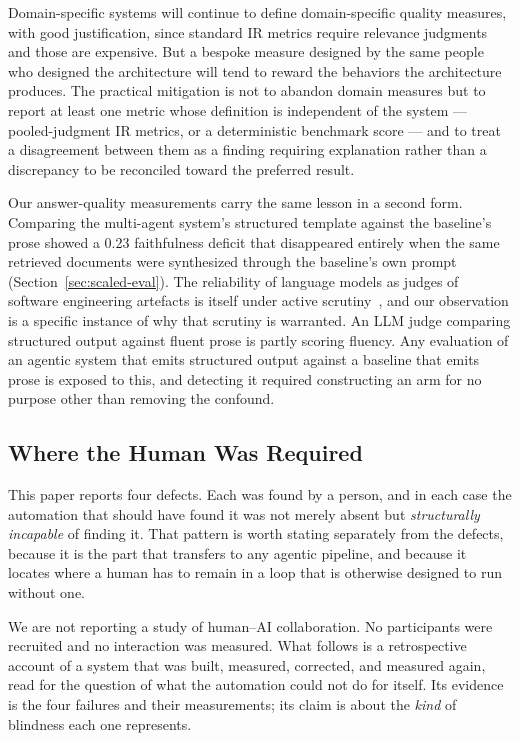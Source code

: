 \documentclass[acmsmall,review,anonymous,screen]{acmart}
\begin{document}
Domain-specific systems will continue to define domain-specific quality measures,
with good justification, since standard IR metrics require relevance judgments and
those are expensive. But a bespoke measure designed by the same people who
designed the architecture will tend to reward the behaviors the architecture
produces. The practical mitigation is not to abandon domain measures but to
report at least one metric whose definition is independent of the system ---
pooled-judgment IR metrics, or a deterministic benchmark score --- and to treat a
disagreement between them as a finding requiring explanation rather than a
discrepancy to be reconciled toward the preferred result.

Our answer-quality measurements carry the same lesson in a second form.
Comparing the multi-agent system's structured template against the baseline's
prose showed a 0.23 faithfulness deficit that disappeared entirely when the same
retrieved documents were synthesized through the baseline's own prompt
(Section~\ref{sec:scaled-eval}). The reliability of language models as judges of
software engineering artefacts is itself under active
scrutiny~\cite{wang2025llmjudge,crupi2025judge,he2026judgese,zhou2025sejury}, and
our observation is a specific instance of why that scrutiny is
warranted. An LLM judge comparing structured output
against fluent prose is partly scoring fluency. Any evaluation of an agentic
system that emits structured output against a baseline that emits prose is
exposed to this, and detecting it required constructing an arm for no purpose
other than removing the confound.

\subsection{Where the Human Was Required}\label{sec:human}

This paper reports four defects. Each was found by a person, and in each case
the automation that should have found it was not merely absent but
\emph{structurally incapable} of finding it. That pattern is worth stating
separately from the defects, because it is the part that transfers to any
agentic pipeline, and because it locates where a human has to remain in a loop
that is otherwise designed to run without one.

We are not reporting a study of human--AI collaboration. No participants were
recruited and no interaction was measured. What follows is a retrospective
account of a system that was built, measured, corrected, and measured again,
read for the question of what the automation could not do for itself. Its
evidence is the four failures and their measurements; its claim is about the
\emph{kind} of blindness each one represents.
\end{document}
